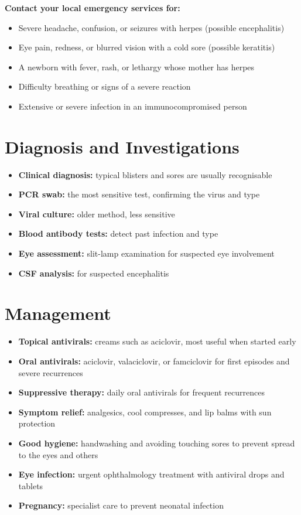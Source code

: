 \textbf{Contact your local emergency services for:}
\begin{itemize}
    \item Severe headache, confusion, or seizures with herpes (possible encephalitis)
    \item Eye pain, redness, or blurred vision with a cold sore (possible keratitis)
    \item A newborn with fever, rash, or lethargy whose mother has herpes
    \item Difficulty breathing or signs of a severe reaction
    \item Extensive or severe infection in an immunocompromised person
\end{itemize}

\section*{Diagnosis and Investigations}
\begin{itemize}
    \item \textbf{Clinical diagnosis:} typical blisters and sores are usually recognisable
    \item \textbf{PCR swab:} the most sensitive test, confirming the virus and type
    \item \textbf{Viral culture:} older method, less sensitive
    \item \textbf{Blood antibody tests:} detect past infection and type
    \item \textbf{Eye assessment:} slit-lamp examination for suspected eye involvement
    \item \textbf{CSF analysis:} for suspected encephalitis
\end{itemize}

\section*{Management}
\begin{itemize}
    \item \textbf{Topical antivirals:} creams such as aciclovir, most useful when started early
    \item \textbf{Oral antivirals:} aciclovir, valaciclovir, or famciclovir for first episodes and severe recurrences
    \item \textbf{Suppressive therapy:} daily oral antivirals for frequent recurrences
    \item \textbf{Symptom relief:} analgesics, cool compresses, and lip balms with sun protection
    \item \textbf{Good hygiene:} handwashing and avoiding touching sores to prevent spread to the eyes and others
    \item \textbf{Eye infection:} urgent ophthalmology treatment with antiviral drops and tablets
    \item \textbf{Pregnancy:} specialist care to prevent neonatal infection
\end{itemize}

